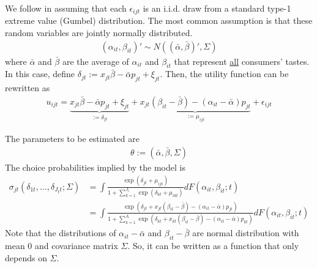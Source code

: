\documentclass[11pt]{elegantbook}
\begin{document}
We follow \cite{berry1995automobile} in assuming that each $\epsilon_{ijt}$ is an i.i.d. draw from a standard type-1 extreme value (Gumbel) distribution. The most common assumption is that these random variables are jointly normally distributed.
\begin{equation}
    \begin{aligned}
        (\alpha_{it},\beta_{it})'\sim N\left((\bar{\alpha},\bar{\beta})',\Sigma\right)
    \end{aligned}
    \nonumber
\end{equation}
where $\bar{\alpha}$ and $\bar{\beta}$ are the average of $\alpha_{it}$ and $\beta_{it}$ that represent \underline{all} consumers' tastes. In this case, define $\delta_{jt}:=x_{jt}\bar{\beta}-\bar{\alpha}p_{jt}+\xi_{jt}$. Then, the utility function can be rewritten as
\begin{equation}
    \begin{aligned}
        u_{ijt}=\underbrace{x_{jt}\bar{\beta}-\bar{\alpha}p_{jt}+\xi_{jt}}_{:=\delta_{jt}}+\underbrace{x_{jt}(\beta_{it}-\bar{\beta})-(\alpha_{it}-\bar{\alpha})p_{jt}}_{:=\mu_{ijt}}+\epsilon_{ijt}
    \end{aligned}
    \nonumber
\end{equation}

The parameters to be estimated are
\begin{equation}
    \begin{aligned}
        \theta:=(\bar{\alpha},\bar{\beta},\Sigma)
    \end{aligned}
    \nonumber
\end{equation}
The choice probabilities implied by the model is
\begin{equation}
    \begin{aligned}
        \sigma_{jt}\left(\delta_{1t},...,\delta_{J_tt};\Sigma\right)&=\int \frac{\exp(\delta_{jt}+\mu_{ijt})}{1+\sum_{k=1}^{J_t}\exp(\delta_{kt}+\mu_{ikt})}d F(\alpha_{it},\beta_{it};t)\\
        &=\int \frac{\exp(\delta_{jt}+x_{jt}(\beta_{it}-\bar{\beta})-(\alpha_{it}-\bar{\alpha})p_{jt})}{1+\sum_{k=1}^{J_t}\exp(\delta_{kt}+x_{kt}(\beta_{it}-\bar{\beta})-(\alpha_{it}-\bar{\alpha})p_{kt})}d F(\alpha_{it},\beta_{it};t)
    \end{aligned}
    \nonumber
\end{equation}
Note that the distributions of $\alpha_{it}-\bar{\alpha}$ and $\beta_{it}-\bar{\beta}$ are normal distribution with mean $0$ and covariance matrix $\Sigma$. So, it can be written as a function that only depends on $\Sigma$.
\end{document}
